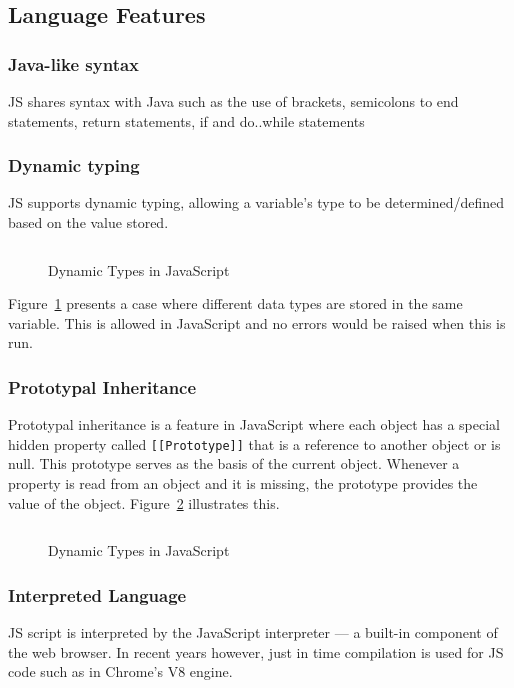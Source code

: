 \documentclass{article}
\newcommand{\js}[1]{\inputminted{javascript}{samples/js/#1.js}}
\newcommand{\jsin}[1]{\texttt{#1}}
\begin{document}
    \subsection{Language Features}

    \subsubsection{Java-like syntax}
    JS shares syntax with Java such as the use of brackets, semicolons to end
    statements, return statements, if and do..while statements

    \subsubsection{Dynamic typing}
    JS supports dynamic typing, allowing a variable’s type to be
    determined/defined based on the value stored.

    \begin{figure}[ht]
      \js{dynamic-typing}
      \caption{Dynamic Types in JavaScript}
      \label{fig:dynamic-typing}
    \end{figure}

    Figure~\ref{fig:dynamic-typing} presents a case where different data types
    are stored in the same variable. This is allowed in JavaScript and no errors
    would be raised when this is run.

    \subsubsection{Prototypal Inheritance}
    Prototypal inheritance is a feature in JavaScript where each object has a
    special hidden property called \jsin{[[Prototype]]} that is a reference to
    another object or is null. This prototype serves as the basis of the current
    object. Whenever a property is read from an object and it is missing, the
    prototype provides the value of the object. Figure~\ref{fig:prototype}
    illustrates this.

    \begin{figure}[ht]
      \js{prototype}
      \caption{Dynamic Types in JavaScript}
      \label{fig:prototype}
    \end{figure}

    \subsubsection{Interpreted Language}
    JS script is interpreted by the JavaScript interpreter --- a built-in
    component of the web browser. In recent years however, just in time
    compilation is used for JS code such as in Chrome’s V8 engine.
\end{document}
